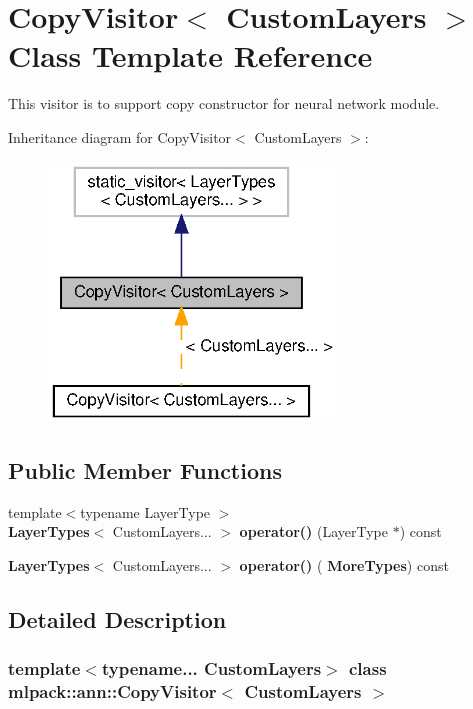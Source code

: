 \section{Copy\+Visitor$<$ Custom\+Layers $>$ Class Template Reference}
\label{classmlpack_1_1ann_1_1CopyVisitor}


This visitor is to support copy constructor for neural network module.  




Inheritance diagram for Copy\+Visitor$<$ Custom\+Layers $>$\+:
\nopagebreak
\begin{figure}[H]
\begin{center}
\leavevmode
\includegraphics[width=217pt]{classmlpack_1_1ann_1_1CopyVisitor__inherit__graph}
\end{center}
\end{figure}
\subsection*{Public Member Functions}
\begin{DoxyCompactItemize}
\item 
{\footnotesize template$<$typename Layer\+Type $>$ }\\\textbf{ Layer\+Types}$<$ Custom\+Layers... $>$ \textbf{ operator()} (Layer\+Type $\ast$) const
\item 
\textbf{ Layer\+Types}$<$ Custom\+Layers... $>$ \textbf{ operator()} (\textbf{ More\+Types}) const
\end{DoxyCompactItemize}


\subsection{Detailed Description}
\subsubsection*{template$<$typename... Custom\+Layers$>$\newline
class mlpack\+::ann\+::\+Copy\+Visitor$<$ Custom\+Layers $>$}

